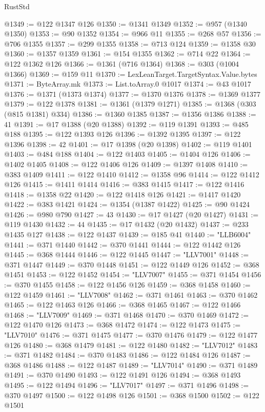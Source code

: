 \begin{lexlean}{RustStd}
\begin{coremodule}
@1349 := @122 @1347 @126
@1350 := @1341 @1349
@1352 := @957 (@1340 @1350)
@1353 := @90 @1352
@1354 := @966 @11
@1355 := @268 @57
@1356 := @706 @1355
@1357 := @299 @1355
@1358 := @713 @124
@1359 := @1358 @30
@1360 := @1357 @1359
@1361 := @154 @1355
@1362 := @714 @22
@1364 := @122 @1362 @126
@1366 := @1361 (@716 @1364)
@1368 := @303 (@1004 @1366)
@1369 := @159 @11
@1370 := LexLeanTarget.TargetSyntax.Value.bytes
@1371 := ByteArray.mk
@1373 := List.toArray.{0} @1017
@1374 := @43 @1017
@1376 := @1371 (@1373 @1374)
@1377 := @1370 @1376
@1378 := @1369 @1377
@1379 := @122 @1378
@1381 := @1361 (@1379 @1271)
@1385 := @1368 (@303 (@815 @1381) @334)
@1386 := @1360 @1385
@1387 := @1356 @1386
@1388 := 41
@1391 := @17 @1388 (@20 @1388)
@1392 := @119 @1391
@1393 := @485 @188
@1395 := @122 @1393 @126
@1396 := @1392 @1395
@1397 := @122 @1396
@1398 := 42
@1401 := @17 @1398 (@20 @1398)
@1402 := @119 @1401
@1403 := @484 @188
@1404 := @122 @1403
@1405 := @1404 @126
@1406 := @1402 @1405
@1408 := @122 @1406 @126
@1409 := @1397 @1408
@1410 := @383 @1409
@1411 := @122 @1410
@1412 := @1358 @96
@1414 := @122 @1412 @126
@1415 := @1411 @1414
@1416 := @383 @1415
@1417 := @122 @1416
@1418 := @1358 @22
@1420 := @122 @1418 @126
@1421 := @1417 @1420
@1422 := @383 @1421
@1424 := @1354 (@1387 @1422)
@1425 := @90 @1424
@1426 := @980 @790
@1427 := 43
@1430 := @17 @1427 (@20 @1427)
@1431 := @119 @1430
@1432 := 44
@1435 := @17 @1432 (@20 @1432)
@1437 := @233 @1435 @127
@1438 := @122 @1437
@1439 := @185 @41
@1440 := "LLB6004"
@1441 := @371 @1440
@1442 := @370 @1441
@1444 := @122 @1442 @126
@1445 := @368 @1444
@1446 := @122 @1445
@1447 := "LLV7001"
@1448 := @371 @1447
@1449 := @370 @1448
@1451 := @122 @1449 @126
@1452 := @368 @1451
@1453 := @122 @1452
@1454 := "LLV7007"
@1455 := @371 @1454
@1456 := @370 @1455
@1458 := @122 @1456 @126
@1459 := @368 @1458
@1460 := @122 @1459
@1461 := "LLV7008"
@1462 := @371 @1461
@1463 := @370 @1462
@1465 := @122 @1463 @126
@1466 := @368 @1465
@1467 := @122 @1466
@1468 := "LLV7009"
@1469 := @371 @1468
@1470 := @370 @1469
@1472 := @122 @1470 @126
@1473 := @368 @1472
@1474 := @122 @1473
@1475 := "LLV7010"
@1476 := @371 @1475
@1477 := @370 @1476
@1479 := @122 @1477 @126
@1480 := @368 @1479
@1481 := @122 @1480
@1482 := "LLV7012"
@1483 := @371 @1482
@1484 := @370 @1483
@1486 := @122 @1484 @126
@1487 := @368 @1486
@1488 := @122 @1487
@1489 := "LLV7014"
@1490 := @371 @1489
@1491 := @370 @1490
@1493 := @122 @1491 @126
@1494 := @368 @1493
@1495 := @122 @1494
@1496 := "LLV7017"
@1497 := @371 @1496
@1498 := @370 @1497
@1500 := @122 @1498 @126
@1501 := @368 @1500
@1502 := @122 @1501

\end{coremodule}
\end{lexlean}
